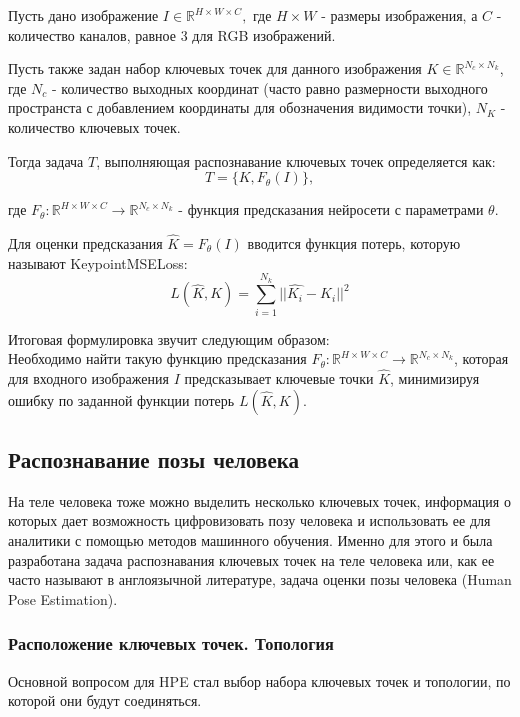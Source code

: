 Пусть дано изображение $I \in \mathbb R^{H \times W \times C},$ где $H \times W$ - размеры изображения, а $C$ - количество каналов, равное 3 для RGB изображений.

Пусть также задан набор ключевых точек для данного изображения $K \in \mathbb R^{N_c \times N_k}$, где $N_c$ - количество выходных координат (часто равно размерности выходного пространста с добавлением координаты для обозначения видимости точки), $N_K$ - количество ключевых точек.

Тогда задача $T$, выполняющая распознавание ключевых точек определяется как:
$$T = \{K, F_{\theta}(I)\},$$

где $F_{\theta}: \mathbb R^{H \times W \times C} \to \mathbb R^{N_c \times N_k}$ - функция предсказания нейросети с параметрами $\theta$.

Для оценки предсказания $\hat{K} = F_{\theta}(I)$ вводится функция потерь, которую называют KeypointMSELoss: $$L(\hat{K}, K) = \sum_{i=1}^{N_k} ||\hat{K_i} - K_i||^2$$ 

Итоговая формулировка звучит следующим образом:\\
Необходимо найти такую функцию предсказания $F_{\theta}: \mathbb R^{H \times W \times C} \to \mathbb R^{N_c \times N_k}$, которая для входного изображения $I$ предсказывает ключевые точки $\hat{K}$, минимизируя ошибку по заданной функции потерь $L(\hat{K}, K)$. 


\subsection{Распознавание позы человека}

На теле человека тоже можно выделить несколько ключевых точек, информация о которых дает возможность цифровизовать позу человека и использовать ее для аналитики с помощью методов машинного обучения. Именно для этого и была разработана задача распознавания ключевых точек на теле человека  или, как ее часто называют в англоязычной литературе, задача оценки позы человека (Human Pose Estimation).

\subsubsection*{Расположение ключевых точек. Топология}

Основной вопросом для HPE стал выбор набора ключевых точек и топологии, по которой они будут соединяться.

